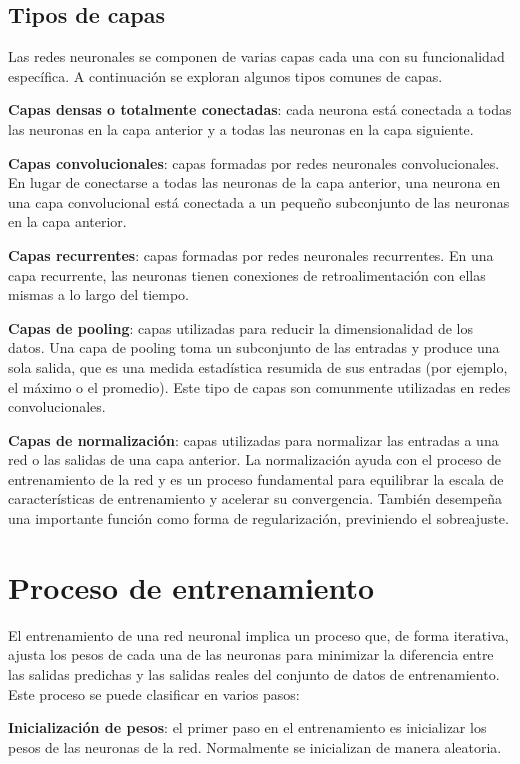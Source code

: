 \subsection{Tipos de capas}

Las redes neuronales se componen de varias capas cada una con su funcionalidad específica. A continuación se exploran algunos tipos comunes de capas. \cite{Rosebrock_2023}

\textbf{Capas densas o totalmente conectadas}: cada neurona está conectada a todas las neuronas en la capa anterior y a todas las neuronas en la capa siguiente.

\textbf{Capas convolucionales}: capas formadas por redes neuronales convolucionales. En lugar de conectarse a todas las neuronas de la capa anterior, una neurona en una capa convolucional está conectada a un pequeño subconjunto de las neuronas en la capa anterior.

\textbf{Capas recurrentes}: capas formadas por redes neuronales recurrentes. En una capa recurrente, las neuronas tienen conexiones de retroalimentación con ellas mismas a lo largo del tiempo.

\textbf{Capas de pooling}: capas utilizadas para reducir la dimensionalidad de los datos. Una capa de pooling toma un subconjunto de las entradas y produce una sola salida, que es una medida estadística resumida de sus entradas (por ejemplo, el máximo o el promedio). Este tipo de capas son comunmente utilizadas en redes convolucionales.

\textbf{Capas de normalización}: capas utilizadas para normalizar las entradas a una red o las salidas de una capa anterior. La normalización ayuda con el proceso de entrenamiento de la red y es un proceso fundamental para equilibrar la escala de características de entrenamiento y acelerar su convergencia. También desempeña una importante función como forma de regularización, previniendo el sobreajuste.

\section{Proceso de entrenamiento}
El entrenamiento de una red neuronal implica un proceso que, de forma iterativa, ajusta los pesos de cada una de las neuronas para minimizar la diferencia entre las salidas predichas y las salidas reales del conjunto de datos de entrenamiento. Este proceso se puede clasificar en varios pasos: \cite{Pramoditha_2022}

\textbf{Inicialización de pesos}: el primer paso en el entrenamiento es inicializar los pesos de las neuronas de la red. Normalmente se inicializan de manera aleatoria.

